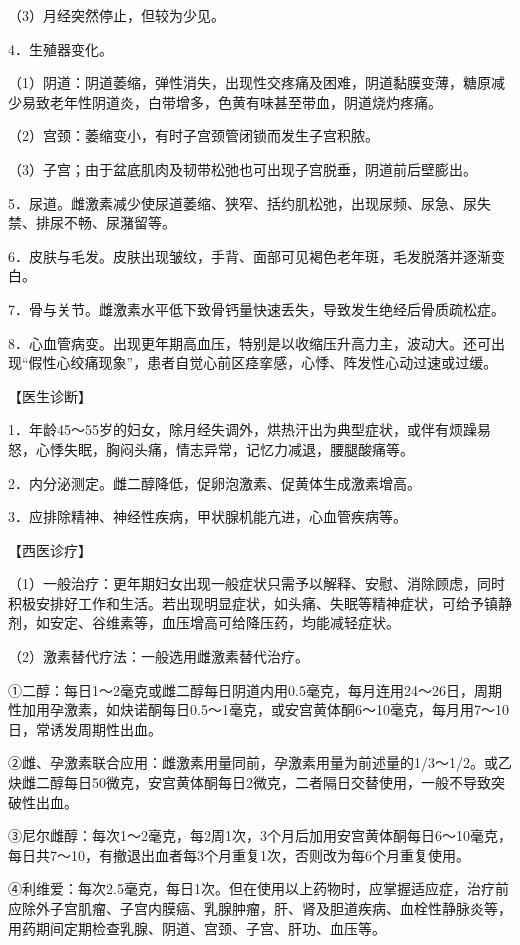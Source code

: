 \documentclass[12pt,UTF8]{ctexbook}
\begin{document}
（3）月经突然停止，但较为少见。

4．生殖器变化。

（1）阴道：阴道萎缩，弹性消失，出现性交疼痛及困难，阴道黏膜变薄，糖原减少易致老年性阴道炎，白带增多，色黄有味甚至带血，阴道烧灼疼痛。

（2）宫颈：萎缩变小，有时子宫颈管闭锁而发生子宫积脓。

（3）子宫；由于盆底肌肉及韧带松弛也可出现子宫脱垂，阴道前后壁膨出。

5．尿道。雌激素减少使尿道萎缩、狭窄、括约肌松弛，出现尿频、尿急、尿失禁、排尿不畅、尿潴留等。

6．皮肤与毛发。皮肤出现皱纹，手背、面部可见褐色老年斑，毛发脱落并逐渐变白。

7．骨与关节。雌激素水平低下致骨钙量快速丢失，导致发生绝经后骨质疏松症。

8．心血管病变。出现更年期高血压，特别是以收缩压升高力主，波动大。还可出现“假性心绞痛现象”，患者自觉心前区痉挛感，心悸、阵发性心动过速或过缓。

【医生诊断】

1．年龄45～55岁的妇女，除月经失调外，烘热汗出为典型症状，或伴有烦躁易怒，心悸失眠，胸闷头痛，情志异常，记忆力减退，腰腿酸痛等。

2．内分泌测定。雌二醇降低，促卵泡激素、促黄体生成激素增高。

3．应排除精神、神经性疾病，甲状腺机能亢进，心血管疾病等。

【西医诊疗】

（1）一般治疗：更年期妇女出现一般症状只需予以解释、安慰、消除顾虑，同时积极安排好工作和生活。若出现明显症状，如头痛、失眠等精神症状，可给予镇静剂，如安定、谷维素等，血压增高可给降压药，均能减轻症状。

（2）激素替代疗法：一般选用雌激素替代治疗。

①二醇：每日1～2毫克或雌二醇每日阴道内用0.5毫克，每月连用24～26日，周期性加用孕激素，如炔诺酮每日0.5～1毫克，或安宫黄体酮6～10毫克，每月用7～10日，常诱发周期性出血。

②雌、孕激素联合应用：雌激素用量同前，孕激素用量为前述量的1/3～1/2。或乙炔雌二醇每日50微克，安宫黄体酮每日2微克，二者隔日交替使用，一般不导致突破性出血。

③尼尔雌醇：每次1～2毫克，每2周1次，3个月后加用安宫黄体酮每日6～10毫克，每日共7～10，有撤退出血者每3个月重复1次，否则改为每6个月重复使用。

④利维爱：每次2.5毫克，每日1次。但在使用以上药物时，应掌握适应症，治疗前应除外子宫肌瘤、子宫内膜癌、乳腺肿瘤，肝、肾及胆道疾病、血栓性静脉炎等，用药期间定期检查乳腺、阴道、宫颈、子宫、肝功、血压等。
\end{document}
